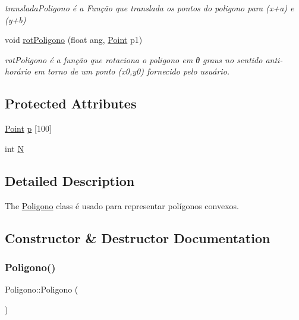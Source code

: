 \begin{DoxyCompactItemize}
\begin{DoxyCompactList}\small\item\em translada\+Poligono é a Função que translada os pontos do poligono para (x+a) e (y+b) \end{DoxyCompactList}\item 
void \mbox{\hyperlink{class_poligono_a8dbf52a0e4da176f014062f9ec0fbafa}{rot\+Poligono}} (float ang, \mbox{\hyperlink{class_point}{Point}} p1)
\begin{DoxyCompactList}\small\item\em rot\+Poligono é a função que rotaciona o poligono em θ graus no sentido anti-\/horário em torno de um ponto (x0,y0) fornecido pelo usuário. \end{DoxyCompactList}\end{DoxyCompactItemize}
\subsection*{Protected Attributes}
\begin{DoxyCompactItemize}
\item 
\mbox{\hyperlink{class_point}{Point}} \mbox{\hyperlink{class_poligono_a5912ffab7b68ee4ac18660b9ea00b5ed}{p}} \mbox{[}100\mbox{]}
\item 
int \mbox{\hyperlink{class_poligono_a9ee4bec594127166d10a527298addc53}{N}}
\end{DoxyCompactItemize}


\subsection{Detailed Description}
The \mbox{\hyperlink{class_poligono}{Poligono}} class é usado para representar polígonos convexos. 

\subsection{Constructor \& Destructor Documentation}
\mbox{\label{class_poligono_a9311a9a1496878c09c8508b3636e2870}} 
\subsubsection{\texorpdfstring{Poligono()}{Poligono()}}
{\footnotesize\ttfamily Poligono\+::\+Poligono (\begin{DoxyParamCaption}{ }\end{DoxyParamCaption})}




